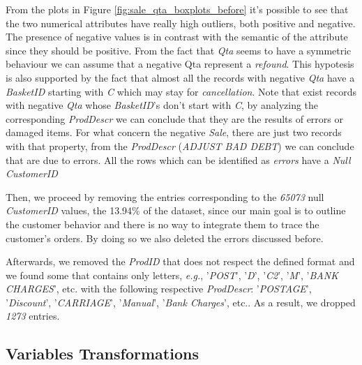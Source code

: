From the plots in Figure \ref{fig:sale_qta_boxplots_before} it's possible to see that the two numerical attributes have really high outliers, both positive and negative. The presence of negative values is in contrast with the semantic of the attribute since they should be positive. From the fact that \emph{Qta} seems to have a symmetric behaviour we can assume that a negative Qta represent a \emph{refound}. This hypotesis is also supported by the fact that almost all the records with negative \emph{Qta} have a \emph{BasketID} starting with \emph{C} which may stay for \emph{cancellation}. Note that exist records with negative \emph{Qta} whose \emph{BasketID}'s don't start with \emph{C}, by analyzing the corresponding \emph{ProdDescr} we can conclude that they are the results of errors or damaged items. For what concern the negative \emph{Sale}, there are just two records with that property, from the \emph{ProdDescr} (\emph{ADJUST BAD DEBT}) we can conclude that are due to errors. All the rows which can be identified as \emph{errors} have a \emph{Null} \emph{CustomerID}

Then, we proceed by removing the entries corresponding to the \emph{65073} null \emph{CustomerID} values, the 13.94\% of the dataset, since our main goal is to outline the customer behavior and there is no way to integrate them to trace the customer's orders. By doing so we also deleted the errors discussed before.

Afterwards, we removed the \emph{ProdID} that does not respect the defined format and we found some that contains only letters, \emph{e.g.}, '\emph{POST}', '\emph{D}', '\emph{C2}', '\emph{M}', '\emph{BANK CHARGES}', etc. with the following respective \emph{ProdDescr}: '\emph{POSTAGE}', '\emph{Discount}', '\emph{CARRIAGE}', '\emph{Manual}', '\emph{Bank Charges}', etc.. As a result, we dropped \emph{1273} entries.

\subsection{Variables Transformations}

